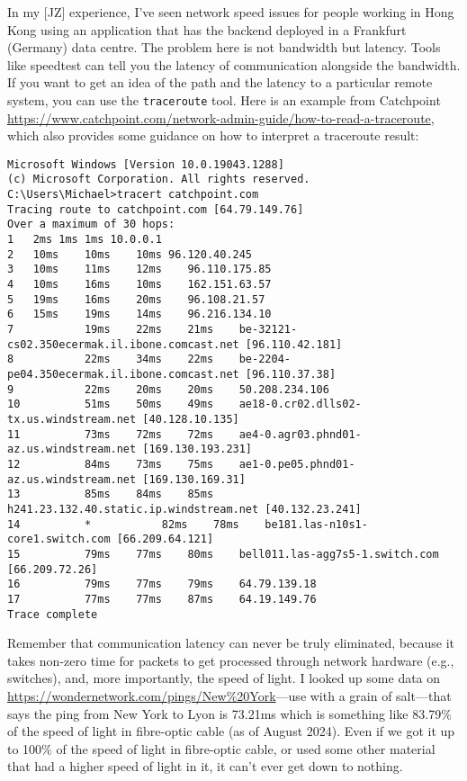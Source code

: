 In my [JZ] experience, I've seen network speed issues for people working in Hong Kong using an application that has the backend deployed in a Frankfurt (Germany) data centre. The problem here is not bandwidth but latency. Tools like speedtest can tell you the latency of communication alongside the bandwidth. If you want to get an idea of the path and the latency to a particular remote system, you can use the \texttt{traceroute} tool. Here is an example from Catchpoint \url{https://www.catchpoint.com/network-admin-guide/how-to-read-a-traceroute}, which also provides some guidance on how to interpret a traceroute result: 

\vspace*{-1em}
{\scriptsize
\begin{verbatim}
Microsoft Windows [Version 10.0.19043.1288]
(c) Microsoft Corporation. All rights reserved.
C:\Users\Michael>tracert catchpoint.com
Tracing route to catchpoint.com [64.79.149.76]
Over a maximum of 30 hops: 
1	2ms	1ms	1ms 10.0.0.1
2 	10ms	10ms	10ms 96.120.40.245
3	10ms	11ms	12ms	96.110.175.85
4	10ms	16ms	10ms 	162.151.63.57
5	19ms	16ms	20ms	96.108.21.57
6	15ms	19ms	14ms	96.216.134.10
7          	19ms 	22ms 	21ms 	be-32121-cs02.350ecermak.il.ibone.comcast.net [96.110.42.181]
8          	22ms 	34ms 	22ms 	be-2204-pe04.350ecermak.il.ibone.comcast.net [96.110.37.38]
9          	22ms 	20ms 	20ms 	50.208.234.106
10       	51ms 	50ms 	49ms 	ae18-0.cr02.dlls02-tx.us.windstream.net [40.128.10.135]
11       	73ms 	72ms 	72ms 	ae4-0.agr03.phnd01-az.us.windstream.net [169.130.193.231]
12       	84ms 	73ms 	75ms 	ae1-0.pe05.phnd01-az.us.windstream.net [169.130.169.31]
13       	85ms 	84ms 	85ms 	h241.23.132.40.static.ip.windstream.net [40.132.23.241]
14       	*         	82ms 	78ms 	be181.las-n10s1-core1.switch.com [66.209.64.121]
15       	79ms 	77ms 	80ms 	bell011.las-agg7s5-1.switch.com [66.209.72.26]
16       	79ms 	77ms 	79ms 	64.79.139.18
17       	77ms 	77ms 	87ms 	64.19.149.76
Trace complete
\end{verbatim}
}
\vspace*{-1em}

Remember that communication latency can never be truly eliminated, because it takes non-zero time for packets to get processed through network hardware (e.g., switches), and, more importantly, the speed of light. I looked up some data on \url{https://wondernetwork.com/pings/New\%20York}---use with a grain of salt---that says the ping from New York to Lyon is 73.21ms which is something like 83.79\% of the speed of light in fibre-optic cable (as of August 2024). Even if we got it up to 100\% of the speed of light in fibre-optic cable, or used some other material that had a higher speed of light in it, it can't ever get down to nothing. 

